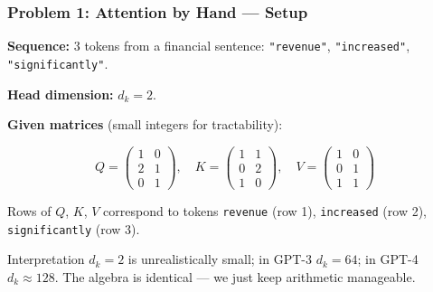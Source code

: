 \documentclass[9pt,t]{beamer}
\begin{document}
\begin{frame}
\frametitle{Problem 1: Attention by Hand — Setup}

\textbf{Sequence:} 3 tokens from a financial sentence: \texttt{"revenue"}, \texttt{"increased"}, \texttt{"significantly"}.

\medskip
\textbf{Head dimension:} $d_k = 2$.

\medskip
\textbf{Given matrices} (small integers for tractability):

\[
Q = \begin{pmatrix} 1 & 0 \\ 2 & 1 \\ 0 & 1 \end{pmatrix},
\quad
K = \begin{pmatrix} 1 & 1 \\ 0 & 2 \\ 1 & 0 \end{pmatrix},
\quad
V = \begin{pmatrix} 1 & 0 \\ 0 & 1 \\ 1 & 1 \end{pmatrix}
\]

Rows of $Q$, $K$, $V$ correspond to tokens \texttt{revenue} (row 1),
\texttt{increased} (row 2), \texttt{significantly} (row 3).

\medskip
\begin{block}{Interpretation}
$d_k = 2$ is unrealistically small; in GPT-3 $d_k = 64$; in GPT-4 $d_k \approx 128$.
The algebra is identical — we just keep arithmetic manageable.
\end{block}
\end{frame}
\end{document}
